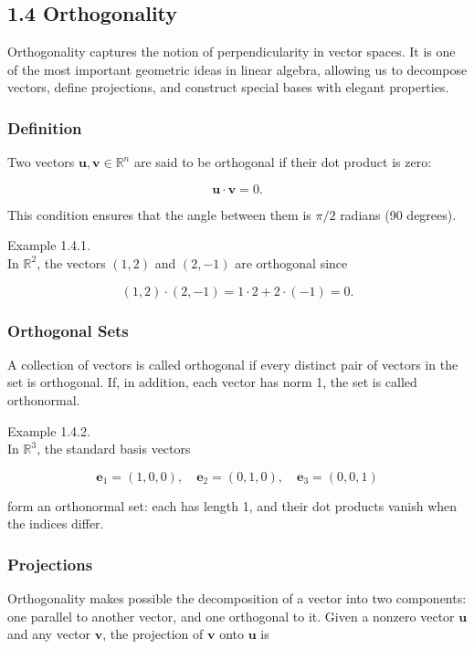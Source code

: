 \documentclass[
  12pt,
  a4paper,
]{article}
\begin{document}
\subsection{1.4 Orthogonality}\label{14-orthogonality}

Orthogonality captures the notion of perpendicularity in vector spaces.
It is one of the most important geometric ideas in linear algebra,
allowing us to decompose vectors, define projections, and construct
special bases with elegant properties.

\subsubsection{Definition}\label{definition}

Two vectors \(\mathbf{u}, \mathbf{v} \in \mathbb{R}^n\) are said to be
orthogonal if their dot product is zero:

\[\mathbf{u} \cdot \mathbf{v} = 0.\]

This condition ensures that the angle between them is \(\pi/2\) radians
(90 degrees).

Example 1.4.1.\\
In \(\mathbb{R}^2\), the vectors \((1,2)\) and \((2,-1)\) are orthogonal
since

\[(1,2) \cdot (2,-1) = 1\cdot 2 + 2\cdot (-1) = 0.\]

\subsubsection{Orthogonal Sets}\label{orthogonal-sets}

A collection of vectors is called orthogonal if every distinct pair of
vectors in the set is orthogonal. If, in addition, each vector has norm
1, the set is called orthonormal.

Example 1.4.2.\\
In \(\mathbb{R}^3\), the standard basis vectors

\[\mathbf{e}_1 = (1,0,0), \quad \mathbf{e}_2 = (0,1,0), \quad \mathbf{e}_3 = (0,0,1)\]

form an orthonormal set: each has length 1, and their dot products
vanish when the indices differ.

\subsubsection{Projections}\label{projections}

Orthogonality makes possible the decomposition of a vector into two
components: one parallel to another vector, and one orthogonal to it.
Given a nonzero vector \(\mathbf{u}\) and any vector \(\mathbf{v}\), the
projection of \(\mathbf{v}\) onto \(\mathbf{u}\) is
\end{document}
